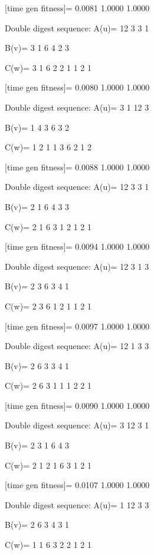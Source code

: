 [time gen fitness]=
    0.0081    1.0000    1.0000

Double digest sequence:
A(u)=
    12     3     3     1

B(v)=
     3     1     6     4     2     3

C(w)=
     3     1     6     2     2     1     1     2     1

[time gen fitness]=
    0.0080    1.0000    1.0000

Double digest sequence:
A(u)=
     3     1    12     3

B(v)=
     1     4     3     6     3     2

C(w)=
     1     2     1     1     3     6     2     1     2

[time gen fitness]=
    0.0088    1.0000    1.0000

Double digest sequence:
A(u)=
    12     3     3     1

B(v)=
     2     1     6     4     3     3

C(w)=
     2     1     6     3     1     2     1     2     1

[time gen fitness]=
    0.0094    1.0000    1.0000

Double digest sequence:
A(u)=
    12     3     1     3

B(v)=
     2     3     6     3     4     1

C(w)=
     2     3     6     1     2     1     1     2     1

[time gen fitness]=
    0.0097    1.0000    1.0000

Double digest sequence:
A(u)=
    12     1     3     3

B(v)=
     2     6     3     3     4     1

C(w)=
     2     6     3     1     1     1     2     2     1

[time gen fitness]=
    0.0090    1.0000    1.0000

Double digest sequence:
A(u)=
     3    12     3     1

B(v)=
     2     3     1     6     4     3

C(w)=
     2     1     2     1     6     3     1     2     1

[time gen fitness]=
    0.0107    1.0000    1.0000

Double digest sequence:
A(u)=
     1    12     3     3

B(v)=
     2     6     3     4     3     1

C(w)=
     1     1     6     3     2     2     1     2     1

